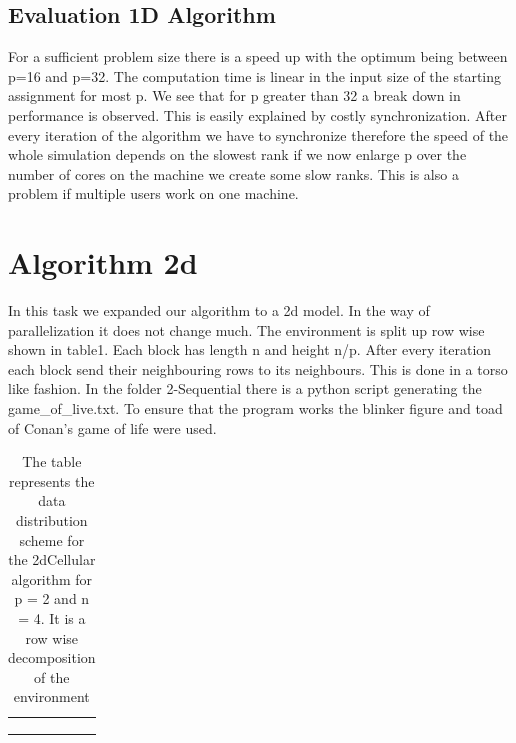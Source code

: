 \documentclass[11pt]{article} %
\begin{document}
\subsection{Evaluation 1D Algorithm}
For a sufficient problem size there is a speed up with the optimum being between  p=16 and  p=32. The computation
time is linear in the input size of the starting assignment for most p. We see that for p greater
than 32 a break down in performance is observed. This is easily explained by costly synchronization.
After every iteration of the algorithm we have to synchronize therefore the speed of the whole
simulation depends on the slowest rank if we now enlarge p over the number of cores on the machine
we create some slow ranks. This is also a problem if multiple users work on one machine. 


\section{Algorithm  2d}
In this task we expanded our algorithm to a 2d model. In the way of parallelization it does not change
much. The environment is split up row wise shown in table1. Each block has length n and height n/p.
After every iteration each block send their neighbouring rows to its neighbours. This is done in a
torso like fashion.
In the folder 2-Sequential there is a python 
script generating the game\_of\_live.txt. 
To ensure that the program works the blinker figure and toad of Conan's game of life were used. 


\begin{table}
\begin{center}
\begin{tabular}{|l|c|c|r|}
  \hline
\cellcolor{blue!15}  & \cellcolor{blue!15} & \cellcolor{blue!15}  & \cellcolor{blue!15}  \\
\hline
\cellcolor{blue!15}  & \cellcolor{blue!15} & \cellcolor{blue!15}  & \cellcolor{blue!15}  \\
\hline
 \cellcolor{red!25}  & \cellcolor{red!25} & \cellcolor{red!25}  & \cellcolor{red!25}  \\
  \hline
\cellcolor{red!25}  & \cellcolor{red!25} & \cellcolor{red!25}  & \cellcolor{red!25}  \\
  \hline
\end{tabular}
\end{center}
  \caption{The table represents the data distribution scheme for the 2dCellular algorithm for 
      p = 2 and n = 4. It is a row wise decomposition of the environment}
\end{table}
\end{document}
